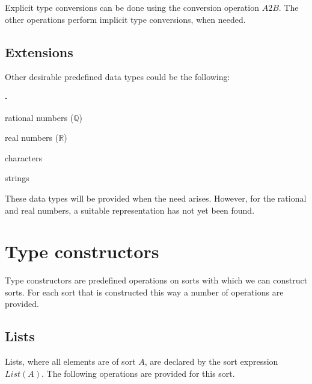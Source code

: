 \documentclass[a4paper,fleqn]{article}
\newenvironment{tdefinitions}[2][0.15em]
  {\begin{list}%
    {#2}%
    {\setlength{\parsep}{0pt}%
     \setlength{\itemsep}{#1}%
     \setlength{\leftmargin}{\mathindent}%
     \setlength{\labelwidth}{\mathindent - \labelsep}%
    }
  }
  {\end{list}}
\newcommand{\frm}[1]{\mbox{\ensuremath{#1}}}
\newcommand{\f}[1]{\ensuremath{\mathit{#1}}}
\newcommand{\fa}[2]{\ensuremath{\f{#1}(#2)}}
\newlength{\tlength}
\begin{document}
\noindent
Explicit type conversions can be done using the conversion operation
\frm{\f{A2B}}. The other operations perform implicit type conversions, when
needed.

\subsection{Extensions}

Other desirable predefined data types could be the following:
\begin{tdefinitions}{-}
\item rational numbers (\frm{\mathbb{Q}})
\item real numbers (\frm{\mathbb{R}})
\item characters
\item strings
\end{tdefinitions}

\noindent
These data types will be provided when the need arises. However, for the
rational and real numbers, a suitable representation has not yet been found.

\section{Type constructors}
\label{sec:TypeConstructors}

Type constructors are predefined operations on sorts with which we can
construct sorts. For each sort that is constructed this way a number of
operations are provided.

\subsection{Lists}

Lists, where all elements are of sort \frm{A}, are declared by the sort
expression \frm{\fa{List}{A}}. The following operations are provided for this
sort.
\end{document}
